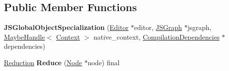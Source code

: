 \subsection*{Public Member Functions}
\begin{DoxyCompactItemize}
\item 
{\bfseries J\+S\+Global\+Object\+Specialization} (\hyperlink{classv8_1_1internal_1_1compiler_1_1_advanced_reducer_1_1_editor}{Editor} $\ast$editor, \hyperlink{classv8_1_1internal_1_1compiler_1_1_j_s_graph}{J\+S\+Graph} $\ast$jsgraph, \hyperlink{classv8_1_1internal_1_1_maybe_handle}{Maybe\+Handle}$<$ \hyperlink{classv8_1_1internal_1_1_context}{Context} $>$ native\+\_\+context, \hyperlink{classv8_1_1internal_1_1_compilation_dependencies}{Compilation\+Dependencies} $\ast$dependencies)\hypertarget{classv8_1_1internal_1_1compiler_1_1_j_s_global_object_specialization_a9acad66eeed3a7cf1050661489038038}{}\label{classv8_1_1internal_1_1compiler_1_1_j_s_global_object_specialization_a9acad66eeed3a7cf1050661489038038}

\item 
\hyperlink{classv8_1_1internal_1_1compiler_1_1_reduction}{Reduction} {\bfseries Reduce} (\hyperlink{classv8_1_1internal_1_1compiler_1_1_node}{Node} $\ast$node) final\hypertarget{classv8_1_1internal_1_1compiler_1_1_j_s_global_object_specialization_a28b000cf106beb27710876de304deea8}{}\label{classv8_1_1internal_1_1compiler_1_1_j_s_global_object_specialization_a28b000cf106beb27710876de304deea8}

\end{DoxyCompactItemize}
